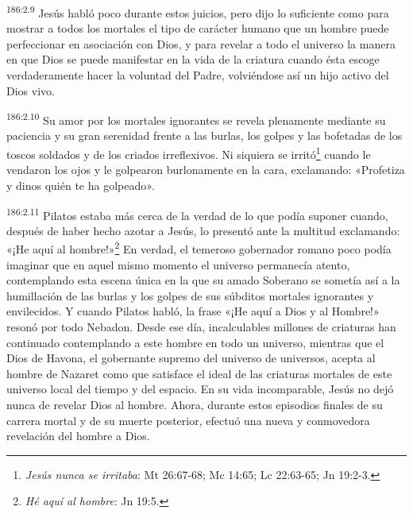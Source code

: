 \par 
\textsuperscript{186:2.9} Jesús habló poco durante estos juicios, pero dijo lo suficiente como para mostrar a todos los mortales el tipo de carácter humano que un hombre puede perfeccionar en asociación con Dios, y para revelar a todo el universo la manera en que Dios se puede manifestar en la vida de la criatura cuando ésta escoge verdaderamente hacer la voluntad del Padre, volviéndose así un hijo activo del Dios vivo.

\par 
\textsuperscript{186:2.10} Su amor por los mortales ignorantes se revela plenamente mediante su paciencia y su gran serenidad frente a las burlas, los golpes y las bofetadas de los toscos soldados y de los criados irreflexivos. Ni siquiera se irritó\footnote{\textit{Jesús nunca se irritaba}: Mt 26:67-68; Mc 14:65; Lc 22:63-65; Jn 19:2-3.} cuando le vendaron los ojos y le golpearon burlonamente en la cara, exclamando: «Profetiza y dinos quién te ha golpeado».

\par 
\textsuperscript{186:2.11} Pilatos estaba más cerca de la verdad de lo que podía suponer cuando, después de haber hecho azotar a Jesús, lo presentó ante la multitud exclamando: «¡He aquí al hombre!»\footnote{\textit{Hé aquí al hombre}: Jn 19:5.} En verdad, el temeroso gobernador romano poco podía imaginar que en aquel mismo momento el universo permanecía atento, contemplando esta escena única en la que su amado Soberano se sometía así a la humillación de las burlas y los golpes de sus súbditos mortales ignorantes y envilecidos. Y cuando Pilatos habló, la frase «¡He aquí a Dios y al Hombre!» resonó por todo Nebadon. Desde ese día, incalculables millones de criaturas han continuado contemplando a este hombre en todo un universo, mientras que el Dios de Havona, el gobernante supremo del universo de universos, acepta al hombre de Nazaret como que satisface el ideal de las criaturas mortales de este universo local del tiempo y del espacio. En su vida incomparable, Jesús no dejó nunca de revelar Dios al hombre. Ahora, durante estos episodios finales de su carrera mortal y de su muerte posterior, efectuó una nueva y conmovedora revelación del hombre a Dios.

